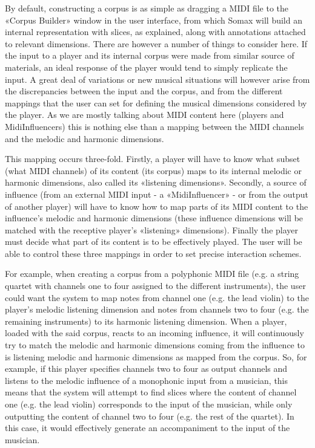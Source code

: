 By default, constructing a corpus is as simple as dragging a MIDI file to the «Corpus Builder» window in the user interface, from which Somax will build an internal representation with slices, as explained, along with annotations attached to relevant dimensions. There are however a number of things to consider here. If the input to a player and its internal corpus were made from similar source of materials, an ideal response of the player would tend to simply replicate the input. A great deal of variations or new musical situations will however arise from the discrepancies between the input and the corpus, and from the different mappings that the user can set for defining the musical dimensions considered by the player. As we are mostly talking about MIDI content here (players and MidiInfluencers) this is nothing else than a mapping between the MIDI channels and the melodic and harmonic dimensions.

This mapping occurs three-fold. Firstly, a player will have to know what subset (what MIDI channels) of its content (its corpus) maps to its internal melodic or harmonic dimensions, also called its «listening dimensions». Secondly, a source of influence (from an external MIDI input - a «MidiInfluencer» - or from the output of another player) will have to know how to map parts of its MIDI content to the influence’s melodic and harmonic dimensions (these influence dimensions will be matched with the receptive player’s «listening» dimensions). Finally the player must decide what part of its content is to be effectively played. The user will be able to control these three mappings in order to set precise interaction schemes.

For example, when creating a corpus from a polyphonic MIDI file (e.g. a string quartet with channels one to four assigned to the different instruments), the user could want the system to map notes from channel one (e.g. the lead violin) to the player's melodic listening dimension and notes from channels two to four (e.g. the remaining instruments) to its harmonic listening dimension. When a player, loaded with the said corpus, reacts to an incoming influence, it will continuously try to match the melodic and harmonic dimensions coming from the influence to is listening melodic and harmonic dimensions as mapped from the corpus. So, for example, if this player specifies channels two to four as output channels and listens to the melodic influence of a monophonic input from a musician, this  means that the system will attempt to find slices where the content of channel one (e.g. the lead violin) corresponds to the input of the musician, while only outputting the content of channel two to four (e.g. the rest of the quartet). In this case, it would effectively generate an accompaniment to the input of the musician.

